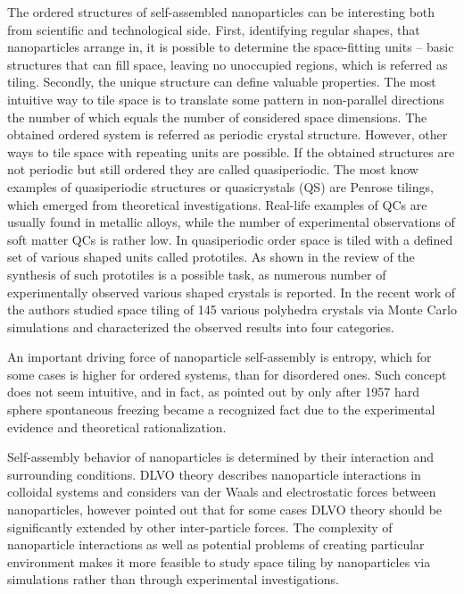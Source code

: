 The ordered structures of self-assembled nanoparticles can be interesting both from scientific and technological side. First, identifying regular shapes, that nanoparticles arrange in, it is possible to determine the space-fitting units -- basic structures that can fill space, leaving no unoccupied regions, which is referred as tiling. Secondly, the unique structure can define valuable properties. The most intuitive way to tile space is to translate some pattern in non-parallel directions the number of which equals the number of considered space dimensions. The obtained ordered system is referred as periodic crystal structure. However, other ways to tile space with repeating units are possible. If the obtained structures are not periodic but still ordered they are called quasiperiodic. The most know examples of quasiperiodic structures or quasicrystals (QS) are Penrose tilings, which emerged from theoretical investigations. Real-life examples of QCs are usually found in metallic alloys,\cite{qcmetal} while the number of experimental observations of soft matter QCs\cite{qcexper,qctalap} is rather low. In quasiperiodic order space is tiled with a defined set of various shaped units called prototiles. As shown in the review of  %
\citet{shapes} the synthesis of such prototiles is a possible task, as numerous number of experimentally observed various shaped crystals is reported. In the recent work of %
\citet{engelscience} the authors studied space tiling of 145 various polyhedra crystals via Monte Carlo simulations and characterized the observed results into four categories.

An important driving force of nanoparticle self-assembly is entropy, which for some cases is higher for ordered systems, than for disordered ones. Such concept does not seem intuitive, and in fact, as pointed out by %
\citet{frenkel2015order} only after 1957 hard sphere spontaneous freezing became a recognized fact due to the experimental evidence and theoretical rationalization.

Self-assembly behavior of nanoparticles is determined by their interaction and surrounding conditions. DLVO theory describes nanoparticle interactions in colloidal systems and considers van der Waals and electrostatic forces between nanoparticles, however %
\citet{notindlvo} pointed out that for some cases DLVO theory should be significantly extended by other inter-particle forces. The complexity of nanoparticle interactions as well as potential problems of creating particular environment makes it more feasible to study space tiling by nanoparticles via simulations rather than through experimental investigations.


